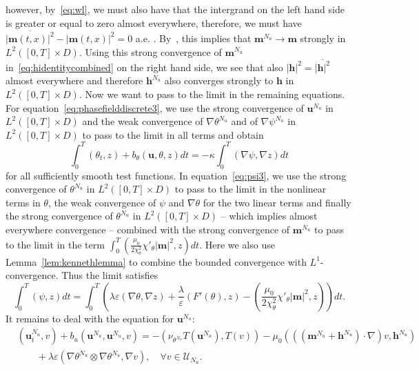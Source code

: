 \documentclass[10pt,letterpaper,twoside]{amsart}
\theoremstyle{definition}{\newtheorem{definition}[lemma]{Definition}}
\theoremstyle{note}{\newtheorem{claim}{Claim}[section]
\newtheorem*{claim*}{Claim}}
\numberwithin{equation}{section}
\newcommand{\dom}{D}
\newcommand{\eps}{\varepsilon}
\newcommand{\Grad}{\nabla}
\newcommand{\bu}{\mathbf{u}}
\newcommand{\bm}{\mathbf{m}}
\newcommand{\bmc}{\mathbf{m}^{N_u}}
\newcommand{\thc}{\theta^{N_u}}
\newcommand{\psic}{\psi^{N_u}}
\newcommand{\bh}{\mathbf{h}}
\begin{document}
 however, by~\eqref{eq:wl}, we must also have that the intergrand on the  left hand side is greater or equal to zero almost everywhere, therefore, we must have $\overline{|\bm(t,x)|^2} - |\bm(t,x)|^2=0$ a.e. . By~\cite[Theorem 1.1.1 (iii)]{Evans1990}, this implies that $\bm^{N_u}\to \bm$ strongly in $L^2([0,T]\times\dom)$. Using this strong convergence of $\bmc$ in~\eqref{eq:hidentitycombined} on the right hand side, we see that also $|\bh|^2 = \overline{|\bh|^2}$ almost everywhere and therefore $\bh^{N_u}$ also converges strongly to $\bh$ in $L^2([0,T]\times\dom)$. Now we want to pass to the limit in the remaining equations. For equation~\eqref{eq:phasefielddiscrete3}, we use the strong convergence of $\bu^{N_u}$ in $L^2([0,T]\times\dom)$ and the weak convergence of $\Grad\thc$ and of $\Grad\psic$ in $L^2([0,T]\times\dom)$ to pass to the limit in all terms and obtain
 \begin{equation}
 	\label{eq:phasefieldfinal}
 	 \int_0^T	(\theta_t,z )+b_\theta(\bu,\theta,z) dt =-\kappa\int_0^T(\Grad\psi,\Grad z)dt
 \end{equation}
 for all sufficiently smooth test functions.  In equation~\eqref{eq:psi3}, we use the strong convergence of $\theta^{N_u}$ in $L^2([0,T]\times\dom)$ to pass to the limit in the nonlinear terms in $\theta$, the weak convergence of $\psi$ and $\Grad\theta$ for the two linear terms and finally the strong convergence of $\theta^{N_u}$ in $L^2([0,T]\times\dom)$ -- which implies almost everywhere convergence -- combined with the strong convergence of $\bm^{N_u}$ to pass to the limit in the term $\int_0^T\left(\frac{\mu_0}{2\chi_\theta^2}\chi'_\theta|\bm|^2,z\right)dt$. Here we also use Lemma~\ref{lem:kennethlemma} to combine the bounded convergence with $L^1$-convergence. Thus the limit satisfies
 \begin{equation}
 	\label{eq:phasefield2final}
 		\int_0^T(\psi,z)dt =\int_0^T\left( \lambda\eps(\Grad\theta,\Grad z) +\frac{\lambda}{\eps}(F'(\theta),z)-\left(\frac{\mu_0}{2\chi_\theta^2}\chi'_\theta|\bm|^2,z\right)\right) dt .
 \end{equation}
 It remains to deal with the equation for $\bu^{N_u}$:
 \begin{align*}
 	&(\bu^{N_u}_t,v)+b_u(\bu^{N_u},\bu^{N_u},v) =-(\nu_{\theta^{N_u}} T(\bu^{N_u}),T( v))-\mu_0(((\bm^{N_u}+\bh^{N_u})\cdot\Grad)v,\bh^{N_u})\\
 	&\qquad +\lambda\eps(\Grad\theta^{N_u}\otimes\Grad\theta^{N_u},\Grad v), \quad \forall v\in \mathcal{U}_{N_u}.
 \end{align*}
\end{document}
